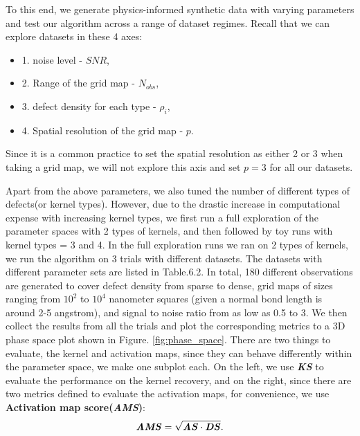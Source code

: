 To this end, we generate physics-informed synthetic data with varying parameters and test our algorithm across a range of dataset regimes. Recall that we can explore datasets in these 4 axes: 
\begin{itemize}
	\item 1. noise level - $SNR$, 
	\item 2. Range of the grid map - $N_{obs}$, 
	\item 3. defect density for each type - $\rho_i$,
	\item 4. Spatial resolution of the grid map - $p$.
\end{itemize}
Since it is a common practice to set the spatial resolution as either 2 or 3 when taking a grid map, we will not explore this axis and set $p=3$ for all our datasets. 

Apart from the above parameters, we also tuned the number of different types of defects(or kernel types). However, due to the drastic increase in computational expense with increasing kernel types, we first run a full exploration of the parameter spaces with 2 types of kernels, and then followed by toy runs with kernel types = 3 and 4. 
In the full exploration runs we ran on 2 types of kernels, we run the algorithm on 3 trials with different datasets. The datasets with different parameter sets are listed in Table.6.2. In total, 180 different observations are generated to cover defect density from sparse to dense, grid maps of sizes ranging from $10^2$ to $10^4$ nanometer squares (given a normal bond length is around 2-5 angstrom), and signal to noise ratio from as low as 0.5 to 3. We then collect the results from all the trials and plot the corresponding metrics to a 3D phase space plot shown in Figure. \ref{fig:phase_space}. There are two things to evaluate, the kernel and activation maps, since they can behave differently within the parameter space, we make one subplot each. On the left, we use \textbf{\textit{KS}} to evaluate the performance on the kernel recovery, and on the right, since there are two metrics defined to evaluate the activation maps, for convenience, we use \textbf{Activation map score(\textit{AMS})}:   
\begin{equation}
	\textbf{\textit{AMS}} = \sqrt{\textbf{\textit{AS}} \cdot \textbf{\textit{DS}}}.
\end{equation} 


